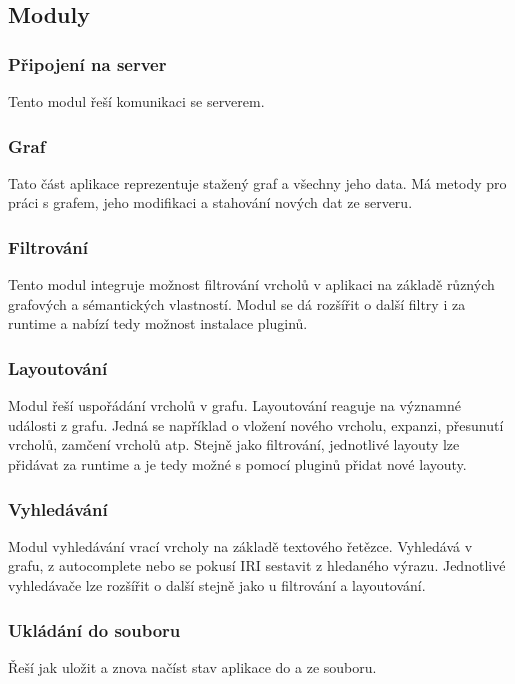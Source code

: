 \subsection{Moduly}

\subsubsection{Připojení na server}
Tento modul řeší komunikaci se serverem.

\subsubsection{Graf}
Tato část aplikace reprezentuje stažený graf a všechny jeho data. Má metody pro práci s grafem, jeho modifikaci a stahování nových dat ze serveru.

\subsubsection{Filtrování}
Tento modul integruje možnost filtrování vrcholů v aplikaci na základě různých grafových a sémantických vlastností. Modul se dá rozšířit o další filtry i za runtime a nabízí tedy možnost instalace pluginů.

\subsubsection{Layoutování}
Modul řeší uspořádání vrcholů v grafu. Layoutování reaguje na významné události z grafu. Jedná se například o vložení nového vrcholu, expanzi, přesunutí vrcholů, zamčení vrcholů atp. Stejně jako filtrování, jednotlivé layouty lze přidávat za runtime a je tedy možné s pomocí pluginů přidat nové layouty.

\subsubsection{Vyhledávání}
Modul vyhledávání vrací vrcholy na základě textového řetězce. Vyhledává v grafu, z autocomplete nebo se pokusí IRI sestavit z hledaného výrazu. Jednotlivé vyhledávače lze rozšířit o další stejně jako u filtrování a layoutování.

\subsubsection{Ukládání do souboru}
Řeší jak uložit a znova načíst stav aplikace do a ze souboru.